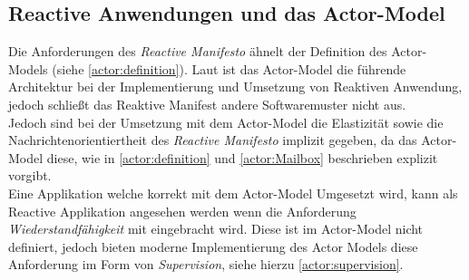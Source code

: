 \subsection{Reactive Anwendungen und das Actor-Model}
Die Anforderungen des \textit{Reactive Manifesto} ähnelt der Definition des Actor-Models (siehe \ref{actor:definition}). Laut \cite{Vernon2015ReactiveAkka} ist das Actor-Model die führende Architektur bei der Implementierung und Umsetzung von Reaktiven Anwendung, jedoch schließt das Reaktive Manifest andere Softwaremuster nicht aus. \\
Jedoch sind bei der Umsetzung mit dem Actor-Model die Elastizität sowie die Nachrichtenorientiertheit des \textit{Reactive Manifesto} implizit gegeben, da das Actor-Model diese, wie in \ref{actor:definition} und \ref{actor:Mailbox} beschrieben explizit vorgibt.\\
Eine Applikation welche korrekt mit dem Actor-Model Umgesetzt wird, kann als Reactive Applikation angesehen werden wenn die Anforderung \textit{Wiederstandfähigkeit} mit eingebracht wird. Diese ist im Actor-Model nicht definiert, jedoch bieten moderne Implementierung des Actor Models diese Anforderung im Form von \textit{Supervision}, siehe hierzu \ref{actor:supervision}.

